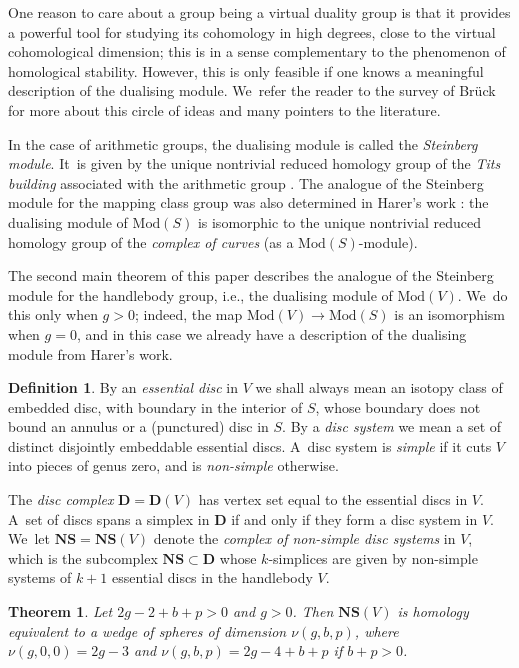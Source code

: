 \documentclass[11pt]{article}
\newcommand{\ie}{i.e.,\xspace}
\theoremstyle{plain}
\newtheorem{thmA}{Theorem}
\theoremstyle{definition}
\newtheorem{defn}[thm]{Definition}
\newcommand{\compNS}{\mathbf{NS}}
\newcommand{\compD}{\mathbf{D}}
\newcommand{\mcg}{\mathrm{Mod}}
\newcommand{\hmod}{\mathrm{Mod}}
\begin{document}
One reason to care about a group being a virtual duality group is that it provides a powerful tool for studying its cohomology in high degrees, close to the virtual cohomological dimension; this is in a sense complementary to the phenomenon of homological stability. However, this is only feasible if one knows a meaningful description of the dualising module. We~refer the reader to the survey of Brück \cite{bruck-survey} for more about this circle of ideas and many pointers to the literature.

In the case of arithmetic groups, the dualising module is called the \emph{Steinberg module}. It~is given by the unique nontrivial reduced homology group of the \emph{Tits building} associated with the arithmetic group \cite{borelserre}. The analogue of the Steinberg module for the mapping class group was also determined in Harer's work \cite{harer}: the dualising module of $\mcg(S)$ is isomorphic to the unique nontrivial reduced homology group of the \emph{complex of curves} (as a $\mcg(S)$-module).

The second main theorem of this paper describes the analogue of the Steinberg module for the handlebody group, \ie the dualising module of $\mcg(V)$. We~do this only when $g>0$; indeed, the map $\hmod(V)\to\mcg(S)$ is an isomorphism when $g=0$, and in this case we already have a description of the dualising module from Harer's work.

\begin{defn}By an \emph{essential disc} in $V$ we shall always mean an isotopy class of embedded disc, with boundary in the interior of $S$, whose boundary does not bound an annulus or a (punctured) disc in $S$. By a \emph{disc system} we mean a set of distinct disjointly embeddable essential discs. A~disc system is \emph{simple} if it cuts $V$ into pieces of genus zero, and is \emph{non-simple} otherwise.

The \emph{disc complex} $\compD=\compD(V)$ has vertex set equal to the essential discs in $V$. A~set of discs spans a simplex in $\compD$ if and only if they form a disc system in $V$. We~let $\compNS = \compNS(V)$ denote the \emph{complex of non-simple disc systems} in $V$, which is the subcomplex $\compNS \subset \compD$ whose $k$-simplices are given by non-simple systems of $k+1$ essential discs in the handlebody $V$. \end{defn}

\begin{thmA}\label{thm:B}Let $2g -2+ b +p > 0$ and $g>0$. Then $\compNS(V)$ is homology equivalent to a wedge of spheres of dimension $\nu(g,b,p)$, where $\nu(g,0,0) = 2g-3$ and $\nu(g,b,p) = 2g-4+b+p$ if $b+p>0$.
\end{thmA}
\end{document}
